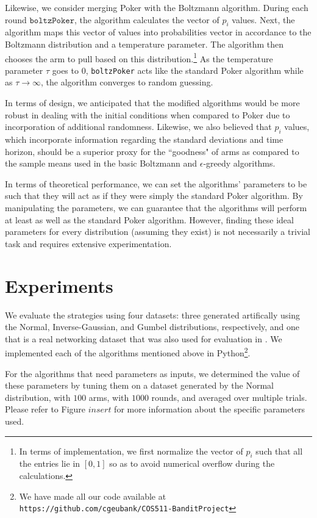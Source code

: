 \documentclass[12pt]{article}
\begin{document}
Likewise, we consider merging Poker with the Boltzmann algorithm. During each round $\texttt{boltzPoker}$, the algorithm calculates the vector of $p_{i}$ values. Next, the algorithm maps this vector of values into probabilities vector in accordance to the Boltzmann distribution and a temperature parameter. The algorithm then chooses the arm to pull based on this distribution.\footnote{In terms of implementation, we first normalize the vector of $p_{i}$ such that all the entries lie in $[0,1]$ so as to avoid numerical overflow during the calculations.} As the temperature parameter $\tau$ goes to 0, \texttt{boltzPoker} acts like the standard Poker algorithm while as $\tau \to \infty$, the algorithm converges to random guessing.

In terms of design, we anticipated that the modified algorithms would be more robust in dealing with the initial conditions when compared to Poker due to incorporation of additional randomness. Likewise,  we also believed that $p_{i}$ values, which incorporate information regarding the standard deviations and time horizon, should be a superior proxy for the ``goodness" of arms as compared to the sample means used in the basic Boltzmann and $\epsilon$-greedy algorithms.

In terms of theoretical performance, we can set the algorithms' parameters to be such that they will act as if they were simply the standard Poker algorithm. By manipulating the parameters, we can guarantee that the algorithms will perform at least as well as the standard Poker algorithm. However, finding these ideal parameters for every distribution (assuming they exist) is not necessarily a trivial task and requires extensive experimentation.

\section{Experiments}

We evaluate the strategies using four datasets: three generated artifically using the Normal, Inverse-Gaussian, and Gumbel distributions, respectively,
and one that is a real networking dataset that was also used for evaluation in \cite{Mohri}. 
We implemented each of the algorithms mentioned above in Python\footnote{We have made all our code available at \texttt{https://github.com/cgeubank/COS511-BanditProject}}. 

For the algorithms that need parameters as inputs, we determined the value of these parameters by tuning them on a dataset generated by the Normal distribution, with $100$ arms,
with $1000$ rounds, and averaged over multiple trials.  Please refer to Figure $insert$ for more information about the specific parameters used.
\end{document}
